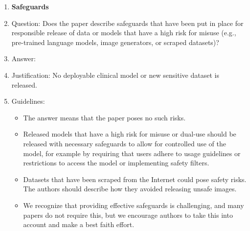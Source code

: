 \documentclass{article}
\begin{document}
\begin{enumerate}
\item {\bf Safeguards}
    \item[] Question: Does the paper describe safeguards that have been put in place for responsible release of data or models that have a high risk for misuse (e.g., pre-trained language models, image generators, or scraped datasets)?
    \item[] Answer: \answerNA{}
    \item[] Justification: No deployable clinical model or new sensitive dataset is released.
    \item[] Guidelines:
    \begin{itemize}
        \item The answer \answerNA{} means that the paper poses no such risks.
        \item Released models that have a high risk for misuse or dual-use should be released with necessary safeguards to allow for controlled use of the model, for example by requiring that users adhere to usage guidelines or restrictions to access the model or implementing safety filters. 
        \item Datasets that have been scraped from the Internet could pose safety risks. The authors should describe how they avoided releasing unsafe images.
        \item We recognize that providing effective safeguards is challenging, and many papers do not require this, but we encourage authors to take this into account and make a best faith effort.
    \end{itemize}


\end{enumerate}
\end{document}
